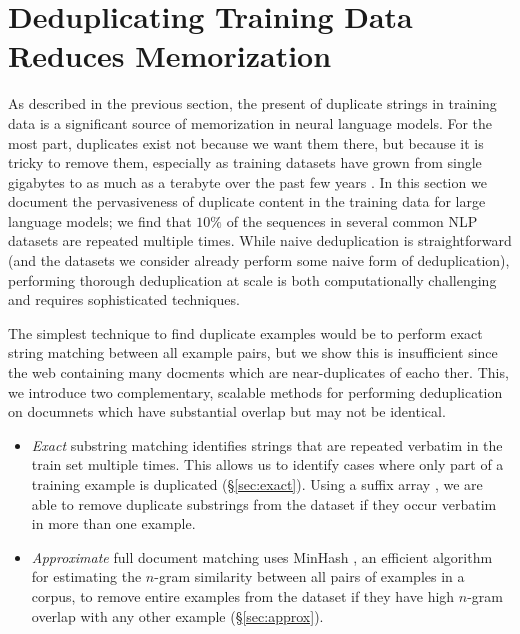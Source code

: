 \section{Deduplicating Training Data Reduces Memorization}
\label{section:dedup}

As described in the previous section, the present of duplicate strings in training data is a significant source of memorization in neural language models.
For the most part, duplicates exist not because we want them there, but because it is tricky to remove them, especially as training datasets have grown from single gigabytes to as much as a terabyte over the past few years \citep{chelba2013one,xue2020mt5,graff2003english,brown2020language}.
In this section we document the pervasiveness of duplicate content in the training data for large language models; we find that $10\%$ of the sequences in several common NLP datasets are repeated multiple times.
While naive deduplication is straightforward
(and the datasets we consider already perform some naive form
of deduplication), performing thorough deduplication at scale is both computationally challenging and requires sophisticated techniques.




The simplest technique to find duplicate examples would be to perform exact string matching between all example pairs, but we show this is insufficient since the web containing many docments which are near-duplicates of eacho ther.
This, we introduce two complementary, scalable methods for performing deduplication on documnets which have substantial overlap but may not be identical.
\begin{itemize}
    \item
\textit{Exact} substring matching identifies strings that are repeated verbatim in the train set multiple times.
This allows us to identify cases where only part of a training example is duplicated (\S\ref{sec:exact}).
Using a suffix array \cite{manber1993suffix}, we are able to remove duplicate substrings from the dataset if they occur verbatim in more than one example.
    \item
\textit{Approximate} full document matching uses  MinHash \citep{broder1997resemblance}, an efficient algorithm for estimating the $n$-gram similarity between all pairs of examples in a corpus, to remove entire examples from the dataset if they have high $n$-gram overlap with any other example (\S\ref{sec:approx}).
\end{itemize}

